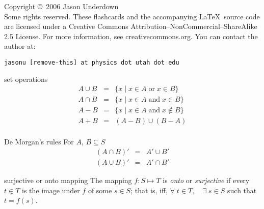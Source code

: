 \documentclass[avery5371,grid]{flashcards}
\begin{document}
\begin{flashcard}{Copyright \copyright \, 2006 Jason Underdown \\
Some rights reserved.}
These flashcards and the accompanying \LaTeX \, source code are licensed
under a Creative Commons Attribution--NonCommercial--ShareAlike 2.5 License.  
For more information, see creativecommons.org.  You can contact the author at:
\begin{center}
\begin{small}\tt jasonu [remove-this] at physics dot utah dot edu\end{small}
\end{center}
\end{flashcard}

\begin{flashcard}[Definition]{set operations}
\begin{eqnarray*}
A \cup B &=& \lbrace x\mid x\in A \;\textrm{or}\; x\in B\rbrace \\
A \cap B &=& \lbrace x\mid x\in A \;\textrm{and}\; x\in B\rbrace \\
A - B &=& \lbrace x\mid x\in A \;\textrm{and}\; x\not\in B\rbrace \\
A + B &=& (A-B) \cup (B-A)\\ 
\end{eqnarray*}
\end{flashcard}

\begin{flashcard}[Theorem]{De Morgan's rules}
For $A$, $B \subseteq S$
\begin{eqnarray*}
(A\cap B)' &=& A' \cup B'\\
(A\cup B)' &=& A' \cap B'
\end{eqnarray*}
\end{flashcard}

\begin{flashcard}[Definition]{surjective or onto mapping}
The mapping $f:S \mapsto T$ is \textit{onto} or \textit{surjective} if every 
$t \in T$ is the image under $f$ of some $s \in S$; that is, iff, $\forall \; t \in T, \quad \exists \; s \in S$ such that $t = f(s)$.
\end{flashcard}
\end{document}
